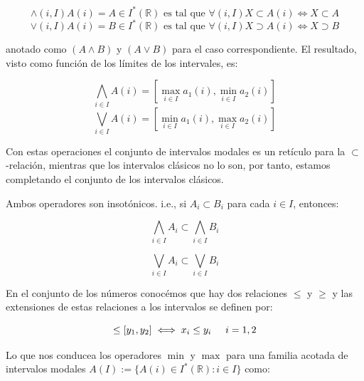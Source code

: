 \begin{equation}
\wedge(i,I) A(i) = A \in I^*(\mathbb{R}) \text{ es  tal que } \forall (i,I) X \subset A(i) \iff X \subset A
\nonumber
\end{equation}
\begin{equation}
\vee(i,I) A(i) = B \in I^*(\mathbb{R}) \text{ es  tal que } \forall (i,I) X \supset A(i) \iff X \supset B
\nonumber
\end{equation}

anotado como $(A \wedge B)$ y $(A \vee B)$ para el caso correspondiente. El resultado, visto como función de los límites de los intervales, es:

\begin{equation}
\bigwedge_{i \in I} A(i) = [\max_{i \in I} a_1(i), \min_{i \in I} a_2(i)]
\nonumber
\end{equation}
\begin{equation}
\bigvee_{i \in I} A(i) = [\min_{i \in I} a_1(i), \max_{i \in I} a_2(i)]
\nonumber
\end{equation}

Con estas operaciones el conjunto de intervalos modales es un retículo para la $\subset$-relación, mientras que los intervalos clásicos no lo son, por tanto, estamos completando el conjunto de los intervalos clásicos.
\par Ambos operadores son insotónicos. i.e.,  si $A_i \subset B_i$ para cada $i \in I$, entonces:

\begin{equation}
\bigwedge_{i \in I} A_i \subset \bigwedge_{i \in I} B_i
\nonumber
\end{equation}

\begin{equation}
\bigvee_{i \in I} A_i \subset \bigvee_{i \in I} B_i
\nonumber
\end{equation}

En el conjunto de los números conocémos que hay dos relaciones $\leq$ y $\geq$ y las extensiones de estas relaciones a los intervalos se definen por:

\begin{equation}
[x_1,x_2] \leq [y_1,y_2] \iff x_i \leq y_i \hspace{0.5cm} i = 1,2
\nonumber
\end{equation}

Lo que nos conducea los operadores $\min$ y $\max$ para una familia acotada de intervalos modales $A(I) := \{ A(i) \in I^*(\mathbb{R}) : i \in I \}$ como:

